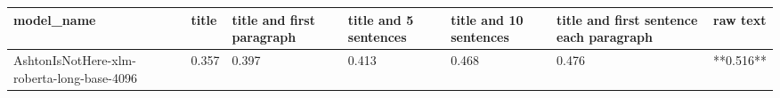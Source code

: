 \begin{tabular}{lllllll}
\toprule
                                model\_name & title & title and first paragraph & title and 5 sentences & title and 10 sentences & title and first sentence each paragraph &  raw text \\
\midrule
AshtonIsNotHere-xlm-roberta-long-base-4096 & 0.357 &                     0.397 &                 0.413 &                  0.468 &                                   0.476 & **0.516** \\
\bottomrule
\end{tabular}
